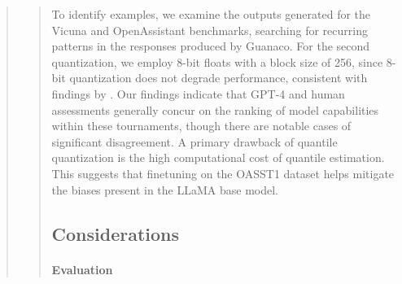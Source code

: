 \begin{quote}
{\begin{abstract}
{To identify examples, we examine the outputs generated for the Vicuna and OpenAssistant benchmarks, searching for recurring patterns in the responses produced by {Guanaco}. For the second quantization, we employ 8-bit floats with a block size of 256, since 8-bit quantization does not degrade performance, consistent with findings by \citet{dettmers2022case}. Our findings indicate that GPT-4 and human assessments generally concur on the ranking of model capabilities within these tournaments, though there are notable cases of significant disagreement. A primary drawback of quantile quantization is the high computational cost of quantile estimation. This suggests that finetuning on the OASST1 dataset helps mitigate the biases present in the LLaMA base model. \subsection{Considerations}
\label{ssec:considerations}

\paragraph{Evaluation}

}
\end{abstract}}
\end{quote}
